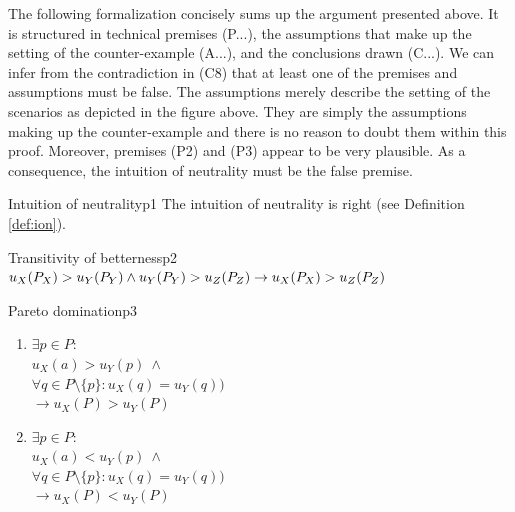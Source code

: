 The following formalization concisely sums up the argument presented above. It is structured in technical premises (P...), the assumptions that make up the setting of the counter-example (A...), and the conclusions drawn (C...). We can infer from the contradiction in (C8) that at least one of the premises and assumptions must be false. The assumptions merely describe the setting of the scenarios as depicted in the figure above. They are simply the assumptions making up the counter-example and there is no reason to doubt them within this proof. Moreover, premises (P2) and (P3) appear to be very plausible. As a consequence, the intuition of neutrality must be the false premise.  

\begin{Premise}{Intuition of neutrality}{p1}
The intuition of neutrality is right (see Definition \ref{def:ion}).
\end{Premise}

\begin{Premise}{Transitivity of betterness}{p2}
$
  u_X(P_X) > u_Y(P_Y) \wedge u_Y(P_Y) > u_Z(P_Z) \\
  \rightarrow
  u_X(P_X) > u_Z(P_Z)
$
\end{Premise}

\begin{Premise}{Pareto domination}{p3}
  \begin{enumerate}
  \item
    $
      \exists p \in P:
    $ \\
    \hspace*{1cm} $
      u_X(a) > u_Y(p) \ \wedge
    $ \\
    \hspace*{1cm} $
      \forall q \in P \setminus \{p\}: u_X(q) = u_Y(q) )
    $ \\
    \hspace*{.5cm} $
      \rightarrow
      u_X(P) > u_Y(P) 
    $
  \item
    $
      \exists p \in P:
    $ \\
    \hspace*{1cm} $
      u_X(a) < u_Y(p) \ \wedge
    $ \\
    \hspace*{1cm} $
      \forall q \in P \setminus \{p\}: u_X(q) = u_Y(q) )
    $ \\
    \hspace*{.5cm} $
      \rightarrow
      u_X(P) < u_Y(P) 
    $
  \end{enumerate}
\end{Premise}

